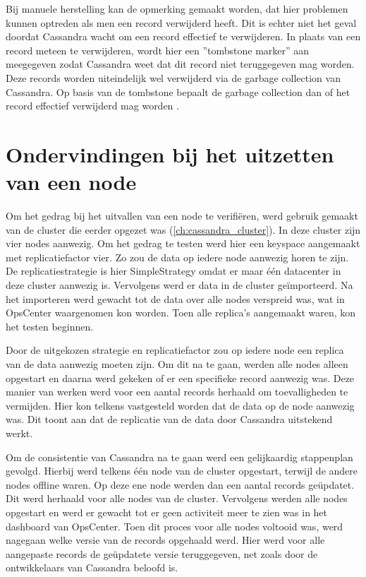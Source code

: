 Bij manuele herstelling kan de opmerking gemaakt worden, dat hier problemen kunnen optreden als men een record verwijderd heeft.
Dit is echter niet het geval doordat Cassandra wacht om een record effectief te verwijderen.
In plaats van een record meteen te verwijderen, wordt hier een ''tombstone marker'' aan meegegeven zodat Cassandra weet dat dit record niet teruggegeven mag worden.
Deze records worden uiteindelijk wel verwijderd via de garbage collection van Cassandra.
Op basis van de tombstone bepaalt de garbage collection dan of het record effectief verwijderd mag worden \citep{strickland2014availability}.

\section{Ondervindingen bij het uitzetten van een node}
Om het gedrag bij het uitvallen van een node te verifiëren, werd gebruik gemaakt van de cluster die eerder opgezet was (\ref{ch:cassandra_cluster}).
In deze cluster zijn vier nodes aanwezig.
Om het gedrag te testen werd hier een keyspace aangemaakt met replicatiefactor vier.
Zo zou de data op iedere node aanwezig horen te zijn.
De replicatiestrategie is hier SimpleStrategy omdat er maar één datacenter in deze cluster aanwezig is. Vervolgens werd er data in de cluster geïmporteerd.
Na het importeren werd gewacht tot de data over alle nodes verspreid was, wat in OpsCenter waargenomen kon worden.
Toen alle replica's aangemaakt waren, kon het testen beginnen.

Door de uitgekozen strategie en replicatiefactor zou op iedere node een replica van de data aanwezig moeten zijn.
Om dit na te gaan, werden alle nodes alleen opgestart en daarna werd gekeken of er een specifieke record aanwezig was.
Deze manier van werken werd voor een aantal records herhaald om toevalligheden te vermijden.
Hier kon telkens vastgesteld worden dat de data op de node aanwezig was.
Dit toont aan dat de replicatie van de data door Cassandra uitstekend werkt.

Om de consistentie van Cassandra na te gaan werd een gelijkaardig stappenplan gevolgd.
Hierbij werd telkens één node van de cluster opgestart, terwijl de andere nodes offline waren.
Op deze ene node werden dan een aantal records geüpdatet.
Dit werd herhaald voor alle nodes van de cluster.
Vervolgens werden alle nodes opgestart en werd er gewacht tot er geen activiteit meer te zien was in het dashboard van OpsCenter.
Toen dit proces voor alle nodes voltooid was, werd nagegaan welke versie van de records opgehaald werd.
Hier werd voor alle aangepaste records de geüpdatete versie teruggegeven, net zoals door de ontwikkelaars van Cassandra beloofd is.